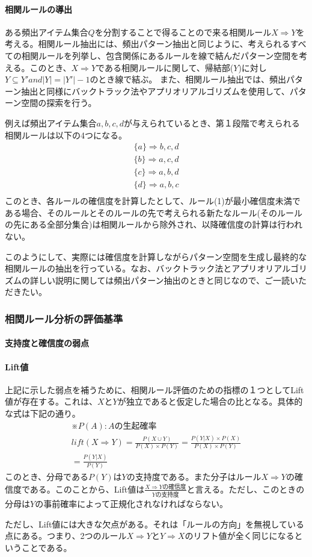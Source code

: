\documentclass[dvipdfmx]{jsarticle}
\begin{document}
\paragraph{相関ルールの導出}
ある頻出アイテム集合$Q$を分割することで得ることので来る相関ルール$X \Rightarrow Y$を考える。相関ルール抽出には、頻出パターン抽出と同じように、考えられるすべての相関ルールを列挙し、包含関係にあるルールを線で結んだパターン空間を考える。このとき、$X \Rightarrow Y$である相関ルールに関して、帰結部($Y$)に対し$Y\subseteq Y' and |Y| = |Y'|-1$のとき線で結ぶ。
また、相関ルール抽出では、頻出パターン抽出と同様にバックトラック法やアプリオリアルゴリズムを使用して、パターン空間の探索を行う。\par
例えば頻出アイテム集合${a, b, c, d}$が与えられているとき、第１段階で考えられる相関ルールは以下の4つになる。
\begin{gather}
  \{a\} \Rightarrow {b, c, d} \\
  \{b\} \Rightarrow {a, c, d} \\
  \{c\} \Rightarrow {a, b, d} \\
  \{d\} \Rightarrow {a, b, c} \\
\end{gather}
このとき、各ルールの確信度を計算したとして、ルール(1)が最小確信度未満である場合、そのルールとそのルールの先で考えられる新たなルール(そのルールの先にある全部分集合)は相関ルールから除外され、以降確信度の計算は行われない。\par
このようにして、実際には確信度を計算しながらパターン空間を生成し最終的な相関ルールの抽出を行っている。なお、バックトラック法とアプリオリアルゴリズムの詳しい説明に関しては頻出パターン抽出のときと同じなので、ご一読いただきたい。
\subsubsection{相関ルール分析の評価基準}
\paragraph{支持度と確信度の弱点}
\paragraph{Lift値}
上記に示した弱点を補うために、相関ルール評価のための指標の１つとしてLift値が存在する。これは、$X$と$Y$が独立であると仮定した場合の比となる。具体的な式は下記の通り。
\begin{gather*}
  ※P(A):Aの生起確率\\
  lift(X \Rightarrow Y) = \frac{P(X\cup Y)}{P(X)\times P(Y)} = \frac{P(Y | X)\times P(X)}{P(X)\times P(Y)} \\
  = \frac{P(Y | X)}{P(Y)}
\end{gather*}
このとき、分母である$P(Y)$は$Y$の支持度である。また分子はルール$X \Rightarrow Y$の確信度である。このことから、Lift値は$\frac{X \Rightarrow Yの確信度}{Yの支持度}$と言える。ただし、このときの分母は$Y$の事前確率によって正規化されなければならない。\par
ただし、Lift値には大きな欠点がある。それは「ルールの方向」を無視している点にある。つまり、2つのルール$X \Rightarrow Y$と$Y\Rightarrow X$のリフト値が全く同じになるということである。
\end{document}

